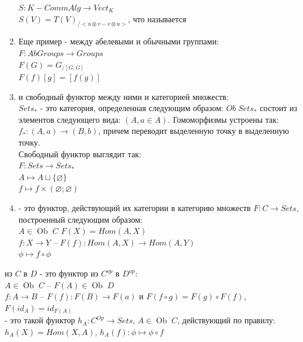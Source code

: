 \documentclass[a4paper]{article}
\theoremstyle{indented}
\theoremstyle{definition}
\theoremstyle{remark}
\DeclareMathOperator{\ra}{\rightarrow}
\DeclareMathOperator{\Ob}{Ob}
\begin{document}
\begin{enumerate}
    $S: K-CommAlg \ra Vect_K$ \\
    $S(V) = T(V)_{/<u \otimes v - v \otimes u>}$, что называется 
    \item Еще пример - между абелевыми и обычными группами: \\
    $F: AbGroups \ra Groups$ \\
    $F(G) = G_{/[G, G]}$ \\
    $F(f)[g] = [f(g)]$
    \item {} и свободный функтор между ними и категорией множеств: \\
    $Sets_*$ - это категория, определенная следующим образом: $Ob\;Sets_*$ состоит из элементов следующего вида: $(A, a \in A)$. Гомоморфизмы устроены так: $f_*: (A, a) \ra (B, b)$, причем переводит выделенную точку в выделенную точку. \\
    Свободный функтор выглядит так: \\
    $F: Sets \ra Sets_*$ \\
    $A \mapsto A \sqcup \{\varnothing\}$ \\
    $f \mapsto f \times (\varnothing; \varnothing)$
    \item {} - это функтор, действующий их категории в категорию множеств $F: C \ra Sets$, построенный следующим образом: \\
    $A\in\Ob\;C$ $F(X) = Hom(A, X)$ \\
    $f: X \ra Y$ -- $F(f): Hom(A, X) \ra Hom(A, Y)$ \\
    $\phi \mapsto f \circ \phi$
\end{enumerate}
 {} из $C$ в $D$ - это функтор из $C^{op}$ в $D^{op}$: \\
$A \in\Ob\;C$ -- $F(A) \in\Ob\;D$ \\
$f: A \ra B$ -- $F(f): F(B) \ra F(a)$ и $F(f \circ g) = F(g) \circ F(f)$, $F(id_A) = id_{F(A)}$ \\
 {} - это такой функтор $h_A: C^{Op} \ra Sets$, $A \in\Ob\;C$, действующий по правилу: \\
$h_A(X) = Hom(X, A)$, $h_A(f): \phi \mapsto \phi \circ f$
\end{document}
